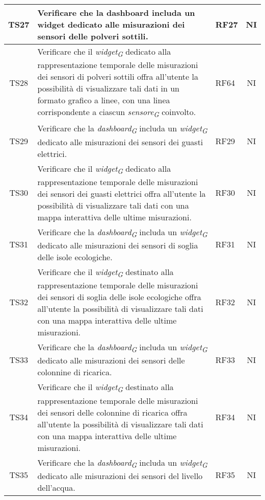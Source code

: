 \begin{longtable}{|c|p{5cm}|>{\raggedright}p{2cm}|c|}
        \hline
        TS27 & Verificare che la dashboard includa un widget dedicato alle misurazioni dei sensori delle polveri sottili. & RF27 & NI \\
        \hline
        TS28 & Verificare che il \textit{widget}\textsubscript{\textit{G}} dedicato alla rappresentazione temporale delle misurazioni dei sensori di polveri sottili offra all'utente la possibilità di visualizzare tali dati in un formato grafico a linee, con una linea corrispondente a ciascun \textit{sensore}\textsubscript{\textit{G}} coinvolto. & RF64 & NI \\
        \hline
        TS29 & Verificare che la \textit{dashboard}\textsubscript{\textit{G}} includa un \textit{widget}\textsubscript{\textit{G}} dedicato alle misurazioni dei sensori dei guasti elettrici. & RF29 & NI \\
        \hline
        TS30 & Verificare che il \textit{widget}\textsubscript{\textit{G}} dedicato alla rappresentazione temporale delle misurazioni dei sensori dei guasti elettrici offra all'utente la possibilità di visualizzare tali dati con una mappa interattiva delle ultime misurazioni. & RF30 & NI \\
        \hline
        TS31 & Verificare che la \textit{dashboard}\textsubscript{\textit{G}} includa un \textit{widget}\textsubscript{\textit{G}} dedicato alle misurazioni dei sensori di soglia delle isole ecologiche. & RF31 & NI \\
        \hline
        TS32 & Verificare che il \textit{widget}\textsubscript{\textit{G}} destinato alla rappresentazione temporale delle misurazioni dei sensori di soglia delle isole ecologiche offra all'utente la possibilità di visualizzare tali dati con una mappa interattiva delle ultime misurazioni. & RF32 & NI \\
        \hline
        TS33 & Verificare che la \textit{dashboard}\textsubscript{\textit{G}} includa un \textit{widget}\textsubscript{\textit{G}} dedicato alle misurazioni dei sensori delle colonnine di ricarica. & RF33 & NI \\
        \hline
        TS34 & Verificare che il \textit{widget}\textsubscript{\textit{G}} destinato alla rappresentazione temporale delle misurazioni dei sensori delle colonnine di ricarica offra all'utente la possibilità di visualizzare tali dati con una mappa interattiva delle ultime misurazioni. & RF34 & NI \\
        \hline
        TS35 & Verificare che la \textit{dashboard}\textsubscript{\textit{G}} includa un \textit{widget}\textsubscript{\textit{G}} dedicato alle misurazioni dei sensori del livello dell'acqua. & RF35 & NI \\

\end{longtable}
